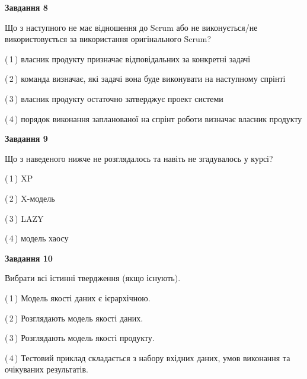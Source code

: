 \documentclass[10pt, ukrainian]{article}
\begin{document}
{\begin {large}
{\begin {center}\textbf{Завдання 8}\end {center}}\par
Що з наступного не має відношення до Scrum або не виконується/не використовується за використання оригінального Scrum?\par
\vspace{2mm}



(\,1\,) власник продукту призначає відповідальних за конкретні задачі%



(\,2\,) команда визначає, які задачі вона буде виконувати на наступному спрінті%



(\,3\,) власник продукту остаточно затверджує проект системи%



(\,4\,) порядок виконання запланованої на спрінт роботи визначає власник продукту%


{\begin {center}\textbf{Завдання 9}\end {center}}\par
Що з наведеного нижче не розглядалось та навіть не згадувалось у курсі?\par
\vspace{2mm}



(\,1\,) XP%



(\,2\,) X-модель%



(\,3\,) LAZY%



(\,4\,) модель хаосу%


{\begin {center}\textbf{Завдання 10}\end {center}}\par
Вибрати всі істинні твердження (якщо існують).\par
\vspace{2mm}



(\,1\,) Модель якості даних є ієрархічною.%



(\,2\,) Розглядають модель якості даних.%



(\,3\,) Розглядають модель якості продукту.%



(\,4\,) Тестовий приклад складається з набору вхідних даних, умов виконання та очікуваних результатів.%



\end {large}}
\end{document}
